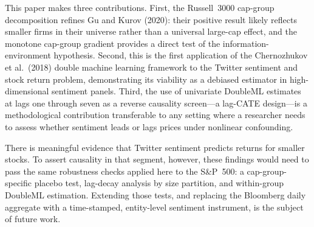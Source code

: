This paper makes three contributions. First, the Russell~3000 cap-group
decomposition refines Gu and Kurov (2020): their positive result likely
reflects smaller firms in their universe rather than a universal large-cap
effect, and the monotone cap-group gradient provides a direct test of the
information-environment hypothesis. Second, this is the first application of
the Chernozhukov et al.\ (2018) double machine learning framework to the
Twitter sentiment and stock return problem, demonstrating its viability as a
debiased estimator in high-dimensional sentiment panels. Third, the use of
univariate DoubleML estimates at lags one through seven as a reverse causality
screen---a lag-CATE design---is a methodological contribution transferable to
any setting where a researcher needs to assess whether sentiment leads or lags
prices under nonlinear confounding.

There is meaningful evidence that Twitter sentiment predicts returns for
smaller stocks. To assert causality in that segment, however, these findings
would need to pass the same robustness checks applied here to the S\&P~500: a
cap-group-specific placebo test, lag-decay analysis by size partition, and
within-group DoubleML estimation. Extending those tests, and replacing the
Bloomberg daily aggregate with a time-stamped, entity-level sentiment
instrument, is the subject of future work.
